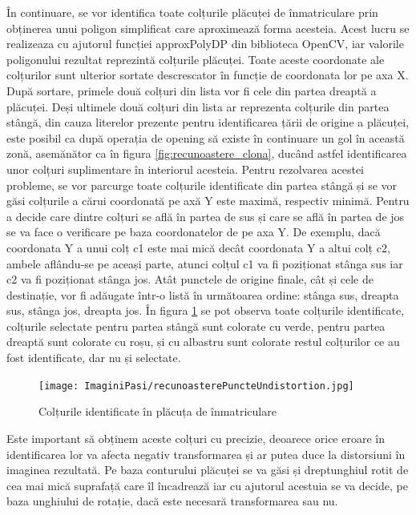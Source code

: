 \documentclass[12pt]{article}
\begin{document}
\^{I}n continuare, se vor identifica toate colțurile pl\u{a}cuței de \^{i}nmatriculare prin obținerea unui poligon simplificat care aproximeaz\u{a} forma acesteia. Acest lucru se realizeaza cu ajutorul funcției approxPolyDP din biblioteca OpenCV, iar valorile poligonului rezultat reprezint\u{a} colțurile pl\u{a}cuței. Toate aceste coordonate ale colțurilor sunt ulterior sortate descrescator \^{i}n funcție de coordonata lor pe axa X. Dup\u{a} sortare, primele dou\u{a} colțuri din lista vor fi cele din partea dreapt\u{a} a pl\u{a}cuței. Deși ultimele dou\u{a} colțuri din lista ar reprezenta colțurile din partea st\^{a}ng\u{a}, din cauza literelor prezente pentru identificarea ț\u{a}rii de origine a pl\u{a}cuței, este posibil ca dup\u{a} operația de opening s\u{a} existe \^{i}n continuare un gol \^{i}n aceast\u{a} zon\u{a}, asem\u{a}n\u{a}tor ca \^{i}n figura \ref{fig:recunoastere_clona}, duc\^{a}nd astfel identificarea unor colțuri suplimentare \^{i}n interiorul acesteia. Pentru rezolvarea acestei probleme, se vor parcurge toate colțurile identificate din partea st\^{a}ng\u{a} și se vor g\u{a}si colțurile a c\u{a}rui coordonat\u{a} pe ax\u{a} Y este maxim\u{a}, respectiv minim\u{a}. Pentru a decide care dintre colțuri se afl\u{a} \^{i}n partea de sus și care se afl\u{a} \^{i}n partea de jos se va face o verificare pe baza coordonatelor de pe axa Y. De exemplu, dac\u{a} coordonata Y a unui colț c1 este mai mic\u{a} dec\^{a}t coordonata Y a altui colț c2, ambele afl\^{a}ndu-se pe aceași parte, atunci colțul c1 va fi poziționat st\^{a}nga sus iar c2 va fi poziționat st\^{a}nga jos. At\^{a}t punctele de origine finale, c\^{a}t și cele de destinație, vor fi ad\u{a}ugate \^{i}ntr-o list\u{a} \^{i}n urm\u{a}toarea ordine: st\^{a}nga sus, dreapta sus, st\^{a}nga jos, dreapta jos. \^{I}n figura \ref{fig:recunoastere_puncte} se pot observa toate colțurile identificate, colțurile selectate pentru partea st\^{a}ng\u{a} sunt colorate cu verde, pentru partea dreapt\u{a} sunt colorate cu roșu, și cu albastru sunt colorate restul colțurilor ce au fost identificate, dar nu și selectate.

\begin{figure}[H]
  \centering
  \texttt{[image: ImaginiPasi/recunoasterePuncteUndistortion.jpg]}
  \caption{Colțurile identificate \^{i}n pl\u{a}cuța de \^{i}nmatriculare}
  \label{fig:recunoastere_puncte}
\end{figure}

Este important s\u{a} obținem aceste colțuri cu precizie, deoarece orice eroare \^{i}n identificarea lor va afecta negativ transformarea și ar putea duce la distorsiuni \^{i}n imaginea rezultată. Pe baza conturului pl\u{a}cuței se va g\u{a}si și dreptunghiul rotit de cea mai mic\u{a} suprafaț\u{a} care \^{i}l \^{i}ncadreaz\u{a} iar cu ajutorul acestuia se va decide, pe baza unghiului de rotație, dac\u{a} este necesar\u{a} transformarea sau nu.
\end{document}
